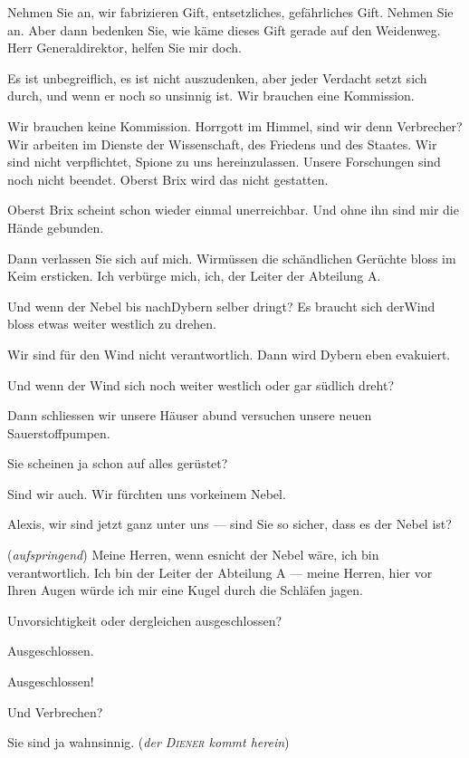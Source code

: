 \documentclass[
	final,
	a4paper,
	ngerman,
	mpinclude = true, %
	twoside = true,
	open = right,
	cleardoublepage = plain,
	DIV = 13,
	BCOR = 1cm,
	titlepage = firstiscover,
	]{scrbook}
\newcommand{\direction}[1]{(\textit{#1})}
\newcommand{\thecharacter}[1]{\textup{\textsc{#1}}\xspace}
\newcommand{\theAlexis}{\thecharacter{Alexis}}
\newcommand{\theThomsen}{\thecharacter{Thomsen}}
\newcommand{\theJonas}{\thecharacter{Jonas}}
\newcommand{\theDiener}{\thecharacter{Diener}}
\newcommand{\character}[1]{\item[#1]}
\newcommand{\Generaldirektor}{\character{Direktor}}
\newcommand{\Alexis}{\character{\theAlexis}}
\newcommand{\Thomsen}{\character{\theThomsen}}
\newcommand{\Jonas}{\character{\theJonas}}
\begin{document}
\begin{play}
\Alexis
Nehmen Sie an, wir fabrizieren Gift, entsetzliches, gefährliches Gift. Nehmen Sie an. Aber dann bedenken Sie, wie käme dieses Gift gerade auf den Weidenweg. Herr Generaldirektor, helfen Sie mir doch.

\Generaldirektor
Es ist unbegreiflich, es ist nicht auszudenken, aber jeder Verdacht setzt sich durch, und wenn er noch so unsinnig ist. Wir brauchen eine Kommission.

\Alexis
Wir brauchen keine Kommission. Horrgott im Himmel, sind wir denn Verbrecher? Wir arbeiten im Dienste der Wissenschaft, des Friedens und des Staates. Wir sind nicht verpflichtet, Spione zu uns hereinzulassen. Unsere Forschungen sind noch nicht beendet. Oberst Brix wird das nicht gestatten.

\Generaldirektor
Oberst Brix scheint schon wieder einmal unerreichbar. Und ohne ihn sind mir die Hände gebunden.

\Alexis
Dann verlassen Sie sich auf mich. Wirmüssen die schändlichen Gerüchte bloss im Keim ersticken. Ich verbürge mich, ich, der Leiter der Abteilung A.

\Generaldirektor
Und wenn der Nebel bis nachDybern selber dringt? Es braucht sich derWind bloss etwas weiter westlich zu drehen.

\Alexis
Wir sind für den Wind nicht verantwortlich. Dann wird Dybern eben evakuiert.

\Jonas
Und wenn der Wind sich noch weiter westlich oder gar südlich dreht?

\Alexis
Dann schliessen wir unsere Häuser abund versuchen unsere neuen Sauerstoffpumpen.

\Jonas
Sie scheinen ja schon auf alles gerüstet?

\Alexis
Sind wir auch. Wir fürchten uns vorkeinem Nebel.

\Generaldirektor
Alexis, wir sind jetzt ganz unter uns --- sind Sie so sicher, dass es der Nebel ist?

\Alexis
\direction{aufspringend} Meine Herren, wenn esnicht der Nebel wäre, ich bin verantwortlich. Ich bin der Leiter der Abteilung A --- meine Herren, hier vor Ihren Augen würde ich mir eine Kugel durch die Schläfen jagen.

\Thomsen
Unvorsichtigkeit oder dergleichen ausgeschlossen?

\Alexis
Ausgeschlossen.

\Generaldirektor
Ausgeschlossen!

\Jonas
Und Verbrechen?

\Alexis
Sie sind ja wahnsinnig. \direction{der \theDiener kommt herein}


\end{play}
\end{document}
